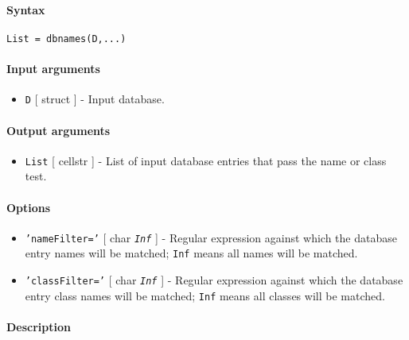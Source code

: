 


	\paragraph{Syntax}

\begin{verbatim}
List = dbnames(D,...)
\end{verbatim}

\paragraph{Input arguments}

\begin{itemize}
\itemsep1pt\parskip0pt
\item
  \texttt{D} {[} struct {]} - Input database.
\end{itemize}

\paragraph{Output arguments}

\begin{itemize}
\itemsep1pt\parskip0pt
\item
  \texttt{List} {[} cellstr {]} - List of input database entries that
  pass the name or class test.
\end{itemize}

\paragraph{Options}

\begin{itemize}
\item
  \texttt{'nameFilter='} {[} char \textbar{} \emph{\texttt{Inf}} {]} -
  Regular expression against which the database entry names will be
  matched; \texttt{Inf} means all names will be matched.
\item
  \texttt{'classFilter='} {[} char \textbar{} \emph{\texttt{Inf}} {]} -
  Regular expression against which the database entry class names will
  be matched; \texttt{Inf} means all classes will be matched.
\end{itemize}

\paragraph{Description}


